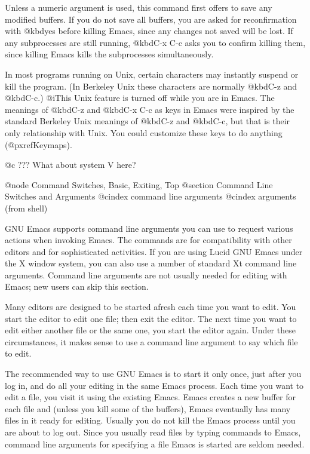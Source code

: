 {{Unless a numeric argument is used, this command first offers to save any
modified buffers.  If you do not save all buffers, you are asked for
reconfirmation with @kbd{yes} before killing Emacs, since any changes
not saved will be lost.  If any subprocesses are still running, @kbd{C-x
C-c} asks you to confirm killing them, since killing Emacs kills the
subprocesses simultaneously.

  In most programs running on Unix, certain characters may instantly
suspend or kill the program.  (In Berkeley Unix these characters are
normally @kbd{C-z} and @kbd{C-c}.)  @i{This Unix feature is turned off
while you are in Emacs.} The meanings of @kbd{C-z} and @kbd{C-x C-c} as
keys in Emacs were inspired by the standard Berkeley Unix meanings of
@kbd{C-z} and @kbd{C-c}, but that is their only relationship with Unix.
You could customize these keys to do anything (@pxref{Keymaps}).

@c ??? What about system V here?

@node Command Switches, Basic, Exiting, Top
@section Command Line Switches and Arguments
@cindex command line arguments
@cindex arguments (from shell)

  GNU Emacs supports command line arguments you can use to request
various actions when invoking Emacs.  The commands are for compatibility
with other editors and for sophisticated activities.  If you are using
Lucid GNU Emacs under the X window system, you can also use a number of
standard Xt command line arguments. Command line arguments are not usually
needed for editing with Emacs; new users can skip this section.

Many editors are designed to be started afresh each time you want to
edit.  You start the editor to edit one file; then exit the editor.  The
next time you want to edit either another file or the same one, you
start the editor again.  Under these circumstances, it makes sense to use a
command line argument to say which file to edit.

  The recommended way to use GNU Emacs is to start it only once, just
after you log in, and do all your editing in the same Emacs process.
Each time you want to edit a file, you visit it using the existing
Emacs.  Emacs creates a new buffer for each file and (unless you kill
some of the buffers), Emacs eventually has many files in it ready for
editing.  Usually you do not kill the Emacs process until you are about
to log out.  Since you usually read files by typing commands to Emacs,
command line arguments for specifying a file Emacs is started are seldom
needed.

}}
